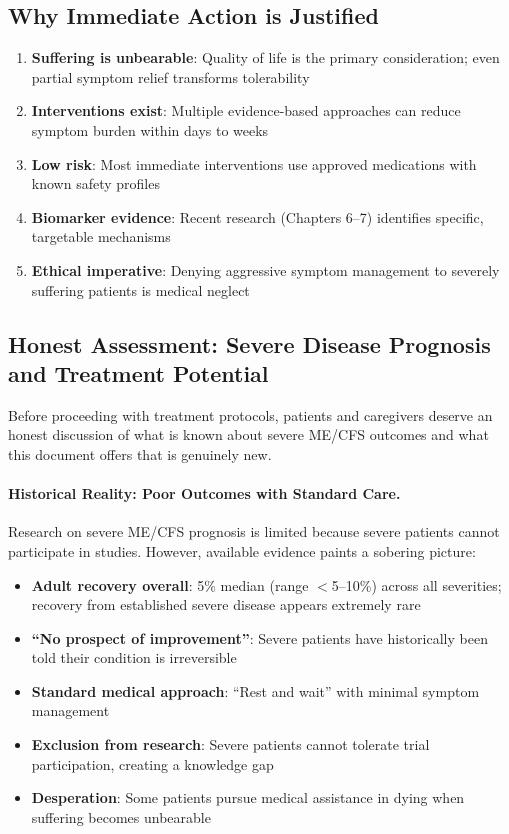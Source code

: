 \subsection{Why Immediate Action is Justified}

\begin{enumerate}
    \item \textbf{Suffering is unbearable}: Quality of life is the primary consideration; even partial symptom relief transforms tolerability
    \item \textbf{Interventions exist}: Multiple evidence-based approaches can reduce symptom burden within days to weeks
    \item \textbf{Low risk}: Most immediate interventions use approved medications with known safety profiles
    \item \textbf{Biomarker evidence}: Recent research (Chapters 6--7) identifies specific, targetable mechanisms
    \item \textbf{Ethical imperative}: Denying aggressive symptom management to severely suffering patients is medical neglect
\end{enumerate}

\subsection{Honest Assessment: Severe Disease Prognosis and Treatment Potential}
\label{sec:severe-prognosis-honesty}

Before proceeding with treatment protocols, patients and caregivers deserve an honest discussion of what is known about severe ME/CFS outcomes and what this document offers that is genuinely new.

\paragraph{Historical Reality: Poor Outcomes with Standard Care.}

Research on severe ME/CFS prognosis is limited because severe patients cannot participate in studies. However, available evidence paints a sobering picture:

\begin{itemize}
    \item \textbf{Adult recovery overall}: 5\% median (range $<$5--10\%) across all severities; recovery from established severe disease appears extremely rare~\cite{Cairns2005prognosis}
    \item \textbf{``No prospect of improvement''}: Severe patients have historically been told their condition is irreversible
    \item \textbf{Standard medical approach}: ``Rest and wait'' with minimal symptom management
    \item \textbf{Exclusion from research}: Severe patients cannot tolerate trial participation, creating a knowledge gap
    \item \textbf{Desperation}: Some patients pursue medical assistance in dying when suffering becomes unbearable
\end{itemize}

